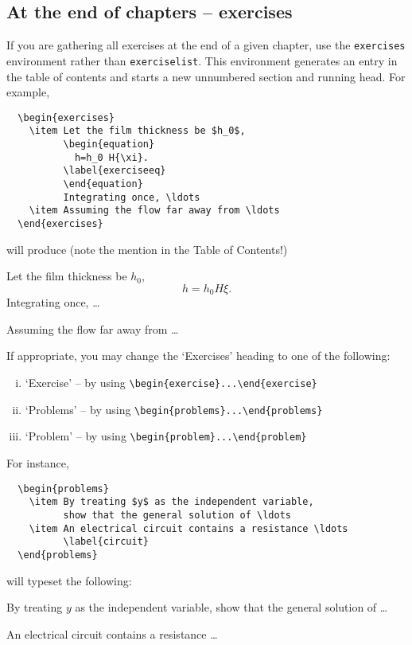 \subsection{At the end of chapters -- exercises}
If you are gathering all exercises at the end of a given chapter,
use the \verb"exercises" environment rather than \verb"exerciselist". This environment generates an entry
in the table of contents and starts a new unnumbered section and running head. For example,
\begin{verbatim}
  \begin{exercises}
    \item Let the film thickness be $h_0$,
          \begin{equation}
            h=h_0 H{\xi}.
          \label{exerciseeq}
          \end{equation}
          Integrating once, \ldots
    \item Assuming the flow far away from \ldots
  \end{exercises}
\end{verbatim}
will produce (note the mention in the Table of Contents!)
  \begin{exercises}
    \item Let the film thickness be $h_0$,
          \begin{equation}
            h=h_0 H{\xi}.
          \label{exerciseeq}
          \end{equation}
          Integrating once, \ldots
    \item Assuming the flow far away from \ldots
  \end{exercises}
%
If appropriate, you may change the `Exercises' heading to one of the following:
%
\begin{enumerate}[(iii)]
\item `Exercise' -- by using \verb"\begin{exercise}...\end{exercise}"
\item `Problems' -- by using \verb"\begin{problems}...\end{problems}"
\item `Problem' -- by using \verb"\begin{problem}...\end{problem}"
\end{enumerate}
%
For instance,
\begin{verbatim}
  \begin{problems}
    \item By treating $y$ as the independent variable,
          show that the general solution of \ldots
    \item An electrical circuit contains a resistance \ldots
          \label{circuit}
  \end{problems}
\end{verbatim}
will typeset the following:
  \begin{problems}
    \item By treating $y$ as the independent variable,
          show that the general solution of \ldots
    \item An electrical circuit contains a resistance \ldots
          \label{circuit}
  \end{problems}


\endinput

